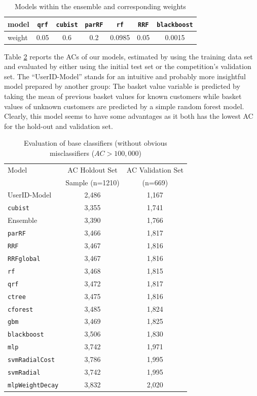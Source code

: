 \documentclass[12pt]{article}
\begin{document}
\begin{table}
	\centering
	\begin{tabular}{l|cccccc}
		\hline
		\hline
		model &\texttt{qrf} & \texttt{cubist} & \texttt{parRF} & \texttt{rf} & \texttt{RRF} & \texttt{blackboost} \\ \hline
		weight & 0.05 & 0.6 & 0.2 & 0.0985 & 0.05 & 0.0015\\
		\hline
		\hline
	\end{tabular}
	\caption{Models within the ensemble and corresponding weights}
	\label{tab:compens}
\end{table}

Table \ref{tab:compres} reports the ACs of our models, estimated by using the training data set and evaluated by either using the initial test set or the competition's validation set. The ``UserID-Model'' stands for an intuitive and probably more insightful model prepared by another group: The basket value variable is predicted by taking the mean of previous basket values for known customers while basket values of unknown customers are predicted by a simple random forest model. Clearly, this model seems to have some advantages as it both has the lowest AC for the hold-out and validation set.\\
\begin{table}
	\centering
	\begin{tabular}{l|cc}
		\hline
		\hline
		Model & AC Holdout Set & AC Validation Set \\
		& Sample (n=1210)  &  (n=669) \\\hline
		UserID-Model & 2,486 & 1,167 \\
		\texttt{cubist} & 3,355 & 1,741\\
		Ensemble & 3,390 & 1,766 \\
		\texttt{parRF} & 3,466 & 1,817 \\
		\texttt{RRF} & 3,467 & 1,816\\
		\texttt{RRFglobal} & 3,467 & 1,816\\
		\texttt{rf} & 3,468 & 1,815\\
		\texttt{qrf} & 3,472 & 1,817\\
		\texttt{ctree} & 3,475 & 1,816\\
		\texttt{cforest} & 3,485 & 1,824\\
		\texttt{gbm }& 3,469 & 1,825\\
		\texttt{blackboost} & 3,506 & 1,830\\
		\texttt{mlp} & 3,742 & 1,971\\
		\texttt{svmRadialCost} & 3,786 & 1,995\\
		\texttt{svmRadial} & 3,742 & 1,995\\
		\texttt{mlpWeightDecay} & 3,832 & 2,020\\
		\hline
		\hline
	\end{tabular}
	\caption{Evaluation of base classifiers (without obvious misclassifiers ($AC > 100,000$)}
	\label{tab:compres}
\end{table}
\end{document}
